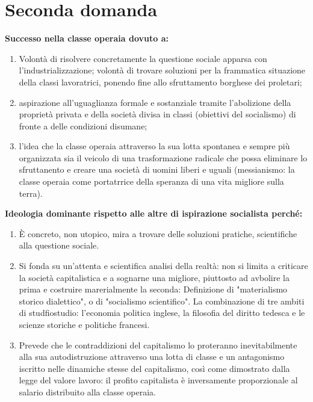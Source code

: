 \documentclass[a4paper]{article}
\begin{document}
\section{Seconda domanda}

\textbf{Successo nella classe operaia dovuto a:}
\begin{enumerate}
    \item Volontà di risolvere concretamente la questione sociale apparsa con l'industrializzazione; volontà di trovare soluzioni per la frammatica situazione della classi lavoratrici, ponendo fine allo sfruttamento borghese dei proletari;
    \item aspirazione all'uguaglianza formale e sostanziale tramite l'abolizione della proprietà privata e della società divisa in classi (obiettivi del socialismo) di fronte a delle condizioni disumane;
    \item l'idea che la classe operaia attraverso la sua lotta spontanea e sempre più organizzata sia il veicolo di una trasformazione radicale che possa eliminare lo sfruttanento e creare una società di uomini liberi e uguali (messianismo: la classe operaia come portatrrice della speranza di una vita migliore sulla terra).
\end{enumerate}

\textbf{Ideologia dominante rispetto alle altre di ispirazione socialista perché:}
\begin{enumerate}
    \item È concreto, non utopico, mira  a trovare delle soluzioni pratiche, scientifiche alla questione sociale.
    \item Si fonda su un'attenta e scientifica analisi della realtà: non si limita a criticare la società capitalistica e a sognarne una migliore, piuttosto ad avbolire la prima e costruire marerialmente la seconda:
        Definizione di "materialismo storico dialettico", o di "socialismo scientifico". La combinazione di tre ambiti di studfiostudio: l'economia politica inglese, la filosofia del diritto tedesca e le scienze storiche e politiche francesi.
    \item Prevede che le contraddizioni del capitalismo lo proteranno inevitabilmente alla sua autodistruzione attraverso una lotta di classe e un antagonismo iscritto nelle dinamiche stesse del capitalismo, così come dimostrato dalla legge del valore lavoro: il profito capitalista è inversamente proporzionale al salario distribuito alla classe operaia.
\end{enumerate}
\end{document}
